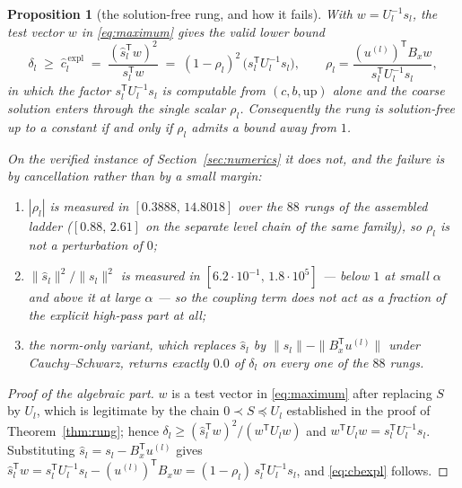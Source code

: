 \documentclass[11pt,a4paper]{article}
\theoremstyle{plain}
\newtheorem{proposition}[theorem]{Proposition}
\theoremstyle{definition}
\newcommand{\T}{\mathsf{T}}
\newcommand{\shat}{\widehat{s}}
\begin{document}
\begin{proposition}[the solution-free rung, and how it fails]
\label{prop:negative}
With $w=U_{l}^{-1}s_{l}$, the test vector $w$ in \eqref{eq:maximum} gives the valid
lower bound
\begin{equation}
\label{eq:cbexpl}
  \delta_{l}\;\ge\;\widehat c^{\,\mathrm{expl}}_{l}
  \;=\;\frac{(\shat_{l}^{\T}w)^{2}}{s_{l}^{\T}w}
  \;=\;(1-\rho_{l})^{2}\,\bigl(s_{l}^{\T}U_{l}^{-1}s_{l}\bigr),
  \qquad
  \rho_{l}=\frac{(u^{(l)})^{\T}B_{x}w}{s_{l}^{\T}U_{l}^{-1}s_{l}},
\end{equation}
in which the factor $s_{l}^{\T}U_{l}^{-1}s_{l}$ is computable from
$(c,b,\mathrm{up})$ alone and the coarse solution enters through the single scalar
$\rho_{l}$. Consequently the rung is solution-free up to a constant \emph{if and only
if} $\rho_{l}$ admits a bound away from $1$.

On the verified instance of Section~\ref{sec:numerics} it does not, and the failure is
by cancellation rather than by a small margin:
\begin{enumerate}[label=\textup{(\roman*)},leftmargin=2.6em]
\item $|\rho_{l}|$ is measured in $[0.3888,\,14.8018]$ over the $88$ rungs of the
  assembled ladder ($[0.88,\,2.61]$ on the separate level chain of the same family),
  so $\rho_{l}$ is not a perturbation of $0$;
\item $\|\shat_{l}\|^{2}/\|s_{l}\|^{2}$ is measured in
  $[6.2\cdot10^{-1},\,1.8\cdot10^{5}]$ --- below $1$ at small $\alpha$ and above it at
  large $\alpha$ --- so the coupling term does not act as a fraction of the explicit
  high-pass part at all;
\item the norm-only variant, which replaces $\shat_{l}$ by
  $\|s_{l}\|-\|B_{x}^{\T}u^{(l)}\|$ under Cauchy--Schwarz, returns exactly
  $0.0$ of $\delta_{l}$ on every one of the $88$ rungs.
\end{enumerate}
\end{proposition}

\begin{proof}[Proof of the algebraic part]
$w$ is a test vector in \eqref{eq:maximum} after replacing $S$ by $U_{l}$, which is
legitimate by the chain $0\prec S\preceq U_{l}$ established in the proof of
Theorem~\ref{thm:rung}; hence
$\delta_{l}\ge(\shat_{l}^{\T}w)^{2}/(w^{\T}U_{l}w)$ and
$w^{\T}U_{l}w=s_{l}^{\T}U_{l}^{-1}s_{l}$. Substituting
$\shat_{l}=s_{l}-B_{x}^{\T}u^{(l)}$ gives
$\shat_{l}^{\T}w=s_{l}^{\T}U_{l}^{-1}s_{l}-(u^{(l)})^{\T}B_{x}w
=(1-\rho_{l})\,s_{l}^{\T}U_{l}^{-1}s_{l}$, and \eqref{eq:cbexpl} follows.
\end{proof}
\end{document}
